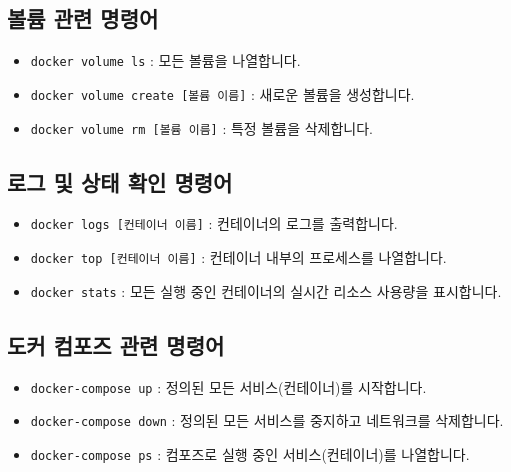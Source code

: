 \documentclass{article}
\begin{document}
\subsection*{볼륨 관련 명령어}
\begin{itemize}
    \item \texttt{docker volume ls} : 모든 볼륨을 나열합니다.
    \item \texttt{docker volume create [볼륨 이름]} : 새로운 볼륨을 생성합니다.
    \item \texttt{docker volume rm [볼륨 이름]} : 특정 볼륨을 삭제합니다.
\end{itemize}

\subsection*{로그 및 상태 확인 명령어}
\begin{itemize}
    \item \texttt{docker logs [컨테이너 이름]} : 컨테이너의 로그를 출력합니다.
    \item \texttt{docker top [컨테이너 이름]} : 컨테이너 내부의 프로세스를 나열합니다.
    \item \texttt{docker stats} : 모든 실행 중인 컨테이너의 실시간 리소스 사용량을 표시합니다.
\end{itemize}

\subsection*{도커 컴포즈 관련 명령어}
\begin{itemize}
    \item \texttt{docker-compose up} : 정의된 모든 서비스(컨테이너)를 시작합니다.
    \item \texttt{docker-compose down} : 정의된 모든 서비스를 중지하고 네트워크를 삭제합니다.
    \item \texttt{docker-compose ps} : 컴포즈로 실행 중인 서비스(컨테이너)를 나열합니다.
\end{itemize}
\end{document}
